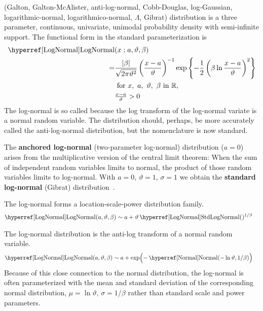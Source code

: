 

\label{sec:LogNormal}
 (Galton, Galton-McAlister, anti-log-normal, Cobb-Douglas, log-Gaussian, logarithmic-normal, logarithmico-normal, $\Lambda$, Gibrat) distribution \cite{Galton1879, McAlister1879, Johnson1994}
 is  a three parameter, continuous, univariate, unimodal probability density with semi-infinite support. The functional form in the standard  parameterization is
 \begin{align}
 \label{LogNormal}
\opr{LogNormal}&(x\given a, \vartheta,\beta) 
 \\ \notag = & \frac{|\beta|}{\sqrt{2\pi \vartheta^2}} \left(\frac{x-a}{\vartheta}\right)^{-1} \exp\left\{-\frac{1}{2} \left(\beta \ln \frac{x-a}{\vartheta} \right)^2 \right\}  \checked
\\ \notag
& \text{ for } x,\ a,\ \vartheta,\ \beta \  \text{in } \Real,  	
 \\ \nonumber
 & \tfrac{x-a}{\vartheta}>0
\end{align}
The log-normal is so called because the log transform of the log-normal variate is a normal random variable. The distribution should, perhaps, be more accurately called the anti-log-normal distribution, but the nomenclature is now standard. 



The {\bf anchored log-normal} (two-parameter log-normal) distribution ($a=0$) arises from the multiplicative version of the central limit theorem: When the sum of independent random variables limits to normal, the product of those random variables limits to log-normal.
With $a=0$, $\vartheta=1$, $\sigma=1$  we obtain the  {\bf standard log-normal} (Gibrat) distribution~\cite{Gibrat1931}.


The log-normal forms a location-scale-power distribution family.
\begin{align*}
\opr{LogNormal}(a, \vartheta, \beta) &\sim a+ \vartheta  \oprr{StdLogNormal}{LogNormal}()^{1/\beta}
\checked
\end{align*}


The log-normal distribution is the anti-log transform of a normal random variable. 
\begin{align*}
\opr{LogNormal}(a, \vartheta, \beta) &\sim a+ \exp\Bigl(- \opr{Normal}(-\ln \vartheta,1/\beta)\Bigr) 
\checked
\end{align*}
Because of this close connection to the normal distribution, the log-normal is often parameterized with the mean and standard deviation of the corresponding normal distribution, $\mu=\ln \vartheta$, $\sigma=1/\beta$ rather than standard scale and power parameters. 


